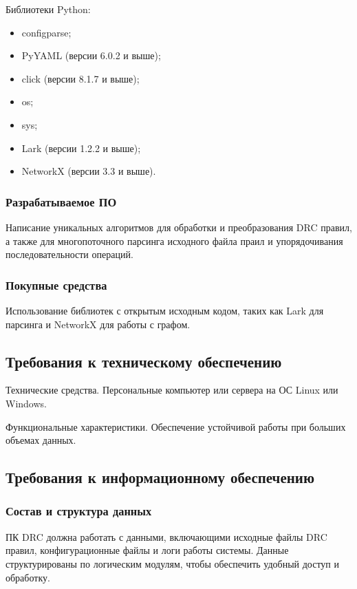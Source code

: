 Библиотеки Python:

\begin{itemize}
	\item configparse;
	\item PyYAML (версии 6.0.2 и выше);
	\item click (версии 8.1.7 и выше);
	\item os;
	\item sys;
	\item Lark (версии 1.2.2 и выше);
	\item NetworkX (версии 3.3 и выше).
\end{itemize}

\subsubsection{Разрабатываемое ПО}

Написание уникальных алгоритмов для обработки и преобразования DRC правил,
а также для многопоточного парсинга исходного файла праил
и упорядочивания последовательности операций.

\subsubsection{Покупные средства}

Использование библиотек с открытым исходным кодом,
таких как Lark для парсинга и NetworkX для работы с графом.

\subsection{Требования к техническому обеспечению}

Технические средства.
Персональные компьютер или сервера на ОС Linux или Windows.

Функциональные характеристики.
Обеспечение устойчивой работы при больших объемах данных.

\subsection{Требования к информационному обеспечению}

\subsubsection{Состав и структура данных}

ПК DRC должна работать с данными, включающими исходные файлы DRC правил,
конфигурационные файлы и логи работы системы.
Данные структурированы по логическим модулям,
чтобы обеспечить удобный доступ и обработку.

